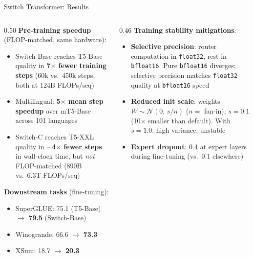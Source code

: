 \begin{frame}{Switch Transformer: Results}

  \begin{columns}
    \begin{column}{0.50\textwidth}
      \textbf{Pre-training speedup} (FLOP-matched, same hardware):
      \begin{itemize}
        \item Switch-Base reaches T5-Base quality in \textbf{7$\times$ fewer training steps} (60k vs.\ 450k steps, both at 124B FLOPs/seq)
        \item Multilingual: \textbf{5$\times$ mean step speedup} over mT5-Base across 101 languages
        \item Switch-C reaches T5-XXL quality in $\sim$\textbf{4$\times$ fewer steps} in wall-clock time, but \emph{not} FLOP-matched (890B vs.\ 6.3T FLOPs/seq)
      \end{itemize}

      \vspace{0.3em}
      \textbf{Downstream tasks} (fine-tuning):
      \begin{itemize}
        \item SuperGLUE: 75.1 (T5-Base) $\to$ \textbf{79.5} (Switch-Base)
        \item Winogrande: 66.6 $\to$ \textbf{73.3}
        \item XSum: 18.7 $\to$ \textbf{20.3}
      \end{itemize}
    \end{column}
    \begin{column}{0.46\textwidth}
      \textbf{Training stability mitigations}:
      \begin{itemize}
        \item \textbf{Selective precision}: router computation in \texttt{float32}, rest in \texttt{bfloat16}. Pure \texttt{bfloat16} diverges; selective precision matches \texttt{float32} quality at \texttt{bfloat16} speed
        \item \textbf{Reduced init scale}: weights $W\sim\mathcal{N}(0,\,s/n)$ ($n=$ fan-in); $s = 0.1$ (10$\times$ smaller than default). With $s=1.0$: high variance, unstable
        \item \textbf{Expert dropout}: 0.4 at expert layers during fine-tuning (vs.\ 0.1 elsewhere)
      \end{itemize}


\end{column}
\end{columns}
\end{frame}
